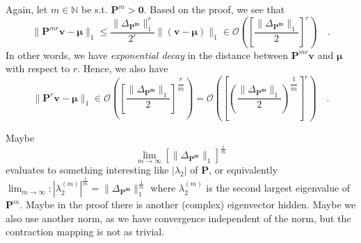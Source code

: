 \documentclass[../../main.tex]{subfiles}
\begin{document}
\begin{remark}
    \label{remark:exponential_decay}
    Again, let $m \in \mathbb{N}$ be s.t. $\bm{P}^m > \bm{0}$. Based on the proof, we see that
    \[
        \| \bm{P}^{mr} \bm{v} - \bm{\mu} \|_1 \leq \dfrac{\|\Delta_{\bm{P^m}}\|_1^r}{2^r} \| (\bm{v} - \bm{\mu}) \|_1 \in \mathcal{O} \left( \left[ \frac{\|\Delta_{\bm{P^m}}\|_1}{2} \right] ^r \right) \quad .
    \]
    In other words, we have \emph{exponential decay} in the distance between $\bm{P}^{mr} \bm{v}$ and $\bm{\mu}$ with respect to $r$. Hence, we also have
    \[
        \| \bm{P}^{r} \bm{v} - \bm{\mu} \|_1 \in \mathcal{O} \left( \left[ \frac{\|\Delta_{\bm{P^m}}\|_1}{2} \right] ^{\dfrac{r}{m}} \right) = 
        \mathcal{O} \left( \left[ \left( \frac{\|\Delta_{\bm{P^m}}\|_1}{2} \right) ^{\dfrac{1}{m}} \right] ^r \right) \quad .
    \]
\end{remark}

\begin{hypothesis}
    Maybe
    \[
        \lim_{m \to \infty} \left[ \|\Delta_{\bm{P^m}}\|_1 \right] ^{\frac{1}{m}}
    \]
    evaluates to something interesting like $|\lambda_2|$ of $\bm{P}$, or equivalently $\lim_{m \to \infty}: |\lambda_2^{(m)}|^{\frac{1}{m}} = \|\Delta_{\bm{P^m}}\|_1^\frac{1}{m}$ where $\lambda_2^{(m)}$ is the second largest eigenvalue of $\bm{P}^m$. Maybe in the proof there is another (complex) eigenvector hidden. Maybe we also use another norm, as we have convergence independent of the norm, but the contraction mapping is not as trivial.
\end{hypothesis}
\end{document}
